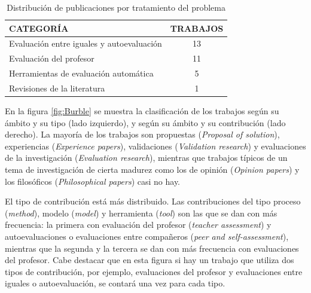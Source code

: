 \begin{table}
  \begin{center}
  \begin{tabular}{| m{10cm} | c |}
    \hline
    CATEGORÍA & TRABAJOS\\
    \hline
    \hline 
    Evaluación entre iguales y autoevaluación & 13\\
    \hline
    Evaluación del profesor & 11\\
    \hline
    Herramientas de evaluación automática & 5\\
    \hline
    Revisiones de la literatura & 1\\
    \hline
  \end{tabular}
\end{center}
\caption{Distribución de publicaciones por tratamiento del problema}
\label{tab:PublicacionesForum}
\end{table} 


En la figura \ref{fig:Burble} se muestra la clasificación de los trabajos según su ámbito y su tipo (lado izquierdo), y según su ámbito y su contribución (lado derecho). La mayoría de los trabajos son propuestas (\emph{Proposal of solution}), experiencias (\emph{Experience papers}), validaciones (\emph{Validation research}) y evaluaciones de la investigación (\emph{Evaluation research}), mientras que trabajos típicos de un tema de investigación de cierta madurez como los de opinión (\emph{Opinion papers}) y los filosóficos (\emph{Philosophical papers}) casi no hay. %

El tipo de contribución está más distribuido. Las contribuciones del tipo proceso (\emph{method}), modelo (\emph{model}) y herramienta (\emph{tool}) son las que se dan con más frecuencia: la primera con evaluación del profesor (\emph{teacher assessment}) y autoevaluaciones o evaluaciones entre compañeros (\emph{peer and self-assessment}), mientras que la segunda y la tercera se dan con más frecuencia con evaluaciones del profesor. Cabe destacar que en esta figura si hay un trabajo que utiliza dos tipos de contribución, por ejemplo, evaluaciones del profesor y evaluaciones entre iguales o autoevaluación, se contará una vez para cada tipo.


